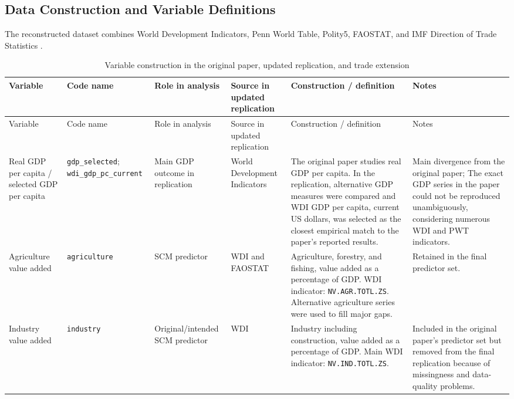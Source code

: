 \documentclass[a4paper]{article}
\begin{document}
\begin{landscape}
\appendix 

\renewcommand{\thesection}{Appendix \Alph{section}:}
\section{Data Construction and Variable Definitions} \label{app:replication_data}
The reconstructed dataset combines World Development Indicators, Penn World Table, Polity5, FAOSTAT, and IMF Direction of Trade Statistics \citep{worldbank2026wdi,feenstra2015pwt,marshall2020polity,faostat2026,imf2026imts}.
\begin{longtable}{P{3cm}P{3cm}P{3cm}P{3cm}P{4.4cm}P{5.2cm}}
\caption{Variable construction in the original paper, updated replication, and trade extension}
\label{tab:variable_construction} \\
\toprule
Variable & Code name & Role in analysis & Source in updated replication & Construction / definition & Notes \\
\midrule
\endfirsthead

\toprule
Variable & Code name & Role in analysis & Source in updated replication & Construction / definition & Notes \\
\midrule
\endhead

Real GDP per capita / selected GDP per capita
& \texttt{gdp\_selected}; \texttt{wdi\_gdp\_pc\_current}
& Main GDP outcome in replication
& World Development Indicators
& The original paper studies real GDP per capita. In the replication, alternative GDP measures were compared and WDI GDP per capita, current US dollars, was selected as the closest empirical match to the paper's reported results.
& Main divergence from the original paper; The exact GDP series in the paper could not be reproduced unambiguously, considering numerous WDI and PWT indicators. \\

Agriculture value added
& \texttt{agriculture}
& SCM predictor
& WDI and FAOSTAT
& Agriculture, forestry, and fishing, value added as a percentage of GDP. WDI indicator: \texttt{NV.AGR.TOTL.ZS}. Alternative agriculture series were used to fill major gaps.
& Retained in the final predictor set. \\

Industry value added
& \texttt{industry}
& Original/intended SCM predictor
& WDI
& Industry including construction, value added as a percentage of GDP. Main WDI indicator: \texttt{NV.IND.TOTL.ZS}.
& Included in the original paper's predictor set but removed from the final replication because of missingness and data-quality problems. \\


\end{longtable}
\end{landscape}
\end{document}
